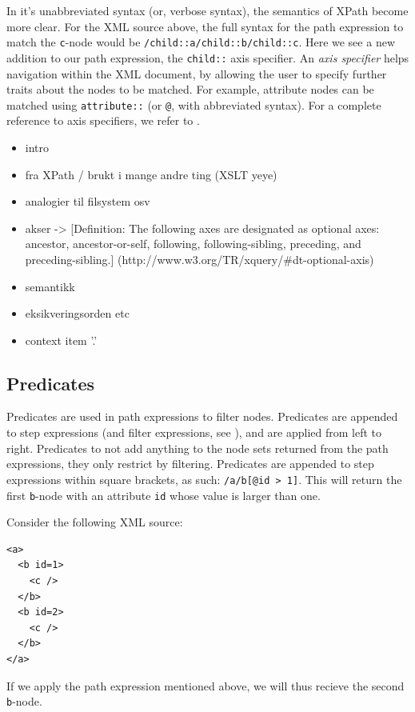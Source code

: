 In it's unabbreviated syntax (or, verbose syntax), the semantics of XPath
become more clear. For the XML source above, the full syntax for the path
expression to match the \verb!c!-node would be
\texttt{/child::a/child::b/child::c}. Here we see a new addition to our path
expression, the \verb!child::! axis specifier. An \textit{axis specifier} helps
navigation within the XML document, by allowing the user to specify further
traits about the nodes to be matched. For example, attribute nodes can be
matched using \verb!attribute::! (or \verb!@!, with abbreviated syntax). For a
complete reference to axis specifiers, we refer to \cite{w3c01}.

\begin{itemize}
\item intro
\item fra XPath / brukt i mange andre ting (XSLT yeye)
\item analogier til filsystem osv
\item akser -> [Definition: The following axes are designated as optional axes:
ancestor, ancestor-or-self, following, following-sibling, preceding, and
preceding-sibling.] (http://www.w3.org/TR/xquery/\#dt-optional-axis)
\item semantikk
\item eksikveringsorden etc
\item context item '.'
\end{itemize}

\subsection{Predicates}
\label{sect:theory:xqueryPredicates}
Predicates are used in path expressions to filter nodes. Predicates are
appended to step expressions (and filter expressions, see \cite{w3c01}), and
are applied from left to right. Predicates to not add anything to the node sets
returned from the path expressions, they only restrict by filtering. Predicates
are appended to step expressions within square brackets, as such:
\verb!/a/b[@id > 1]!. This will return the first \verb!b!-node with an
attribute \verb!id! whose value is larger than one.

Consider the following XML source:
\begin{verbatim}
<a>
  <b id=1>
    <c />
  </b>
  <b id=2>
    <c />
  </b>
</a>
\end{verbatim}
If we apply the path expression mentioned above, we will thus recieve the second
\verb!b!-node.


